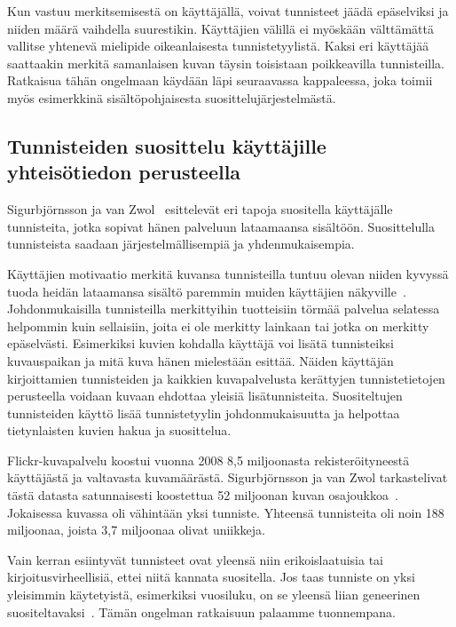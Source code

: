 \documentclass[12pt,finnish]{tktltiki2}
\theoremstyle{definition}
\theoremstyle{remark}
\begin{document}
Kun vastuu merkitsemisestä on käyttäjällä, voivat tunnisteet jäädä epäselviksi ja niiden määrä vaihdella suurestikin. Käyttäjien välillä ei myöskään välttämättä vallitse yhtenevä mielipide oikeanlaisesta tunnistetyylistä. Kaksi eri käyttäjää saattaakin merkitä samanlaisen kuvan täysin toisistaan poikkeavilla tunnisteilla. Ratkaisua tähän ongelmaan käydään läpi seuraavassa kappaleessa, joka toimii myös esimerkkinä sisältöpohjaisesta suosittelujärjestelmästä.


\subsection{Tunnisteiden suosittelu käyttäjille yhteisötiedon perusteella}

Sigurbjörnsson ja van Zwol~\cite{Sigurbjornsson:2008:FTR:1367497.1367542} esittelevät eri tapoja suositella käyttäjälle tunnisteita, jotka sopivat hänen palveluun lataamaansa sisältöön. Suosittelulla tunnisteista saadaan järjestelmällisempiä ja yhdenmukaisempia.

Käyttäjien motivaatio merkitä kuvansa tunnisteilla tuntuu olevan niiden kyvyssä tuoda heidän lataamansa sisältö paremmin muiden käyttäjien näkyville~\cite{Ames:2007:WWT:1240624.1240772}. Johdonmukaisilla tunnisteilla merkittyihin tuotteisiin törmää palvelua selatessa helpommin kuin sellaisiin, joita ei ole merkitty lainkaan tai jotka on merkitty epäselvästi. Esimerkiksi kuvien kohdalla käyttäjä voi lisätä tunnisteiksi kuvauspaikan ja mitä kuva hänen mielestään esittää. Näiden käyttäjän kirjoittamien tunnisteiden ja kaikkien kuvapalvelusta kerättyjen tunnistetietojen perusteella voidaan kuvaan ehdottaa yleisiä lisätunnisteita. Suositeltujen tunnisteiden käyttö lisää tunnistetyylin johdonmukaisuutta ja helpottaa tietynlaisten kuvien hakua ja suosittelua.

Flickr-kuvapalvelu koostui vuonna 2008 8,5 miljoonasta rekisteröityneestä käyttäjästä ja valtavasta kuvamäärästä. Sigurbjörnsson ja van Zwol tarkastelivat tästä datasta satunnaisesti koostettua 52 miljoonan kuvan osajoukkoa~\cite{Sigurbjornsson:2008:FTR:1367497.1367542}. Jokaisessa kuvassa oli vähintään yksi tunniste. Yhteensä tunnisteita oli noin 188 miljoonaa, joista 3,7 miljoonaa olivat uniikkeja.

	Vain kerran esiintyvät tunnisteet ovat yleensä niin erikoislaatuisia tai kirjoitusvirheellisiä, ettei niitä kannata suositella. Jos taas tunniste on yksi yleisimmin käytetyistä, esimerkiksi vuosiluku, on se yleensä liian geneerinen suositeltavaksi~\cite{Sigurbjornsson:2008:FTR:1367497.1367542}. Tämän ongelman ratkaisuun palaamme tuonnempana.
	
\end{document}
